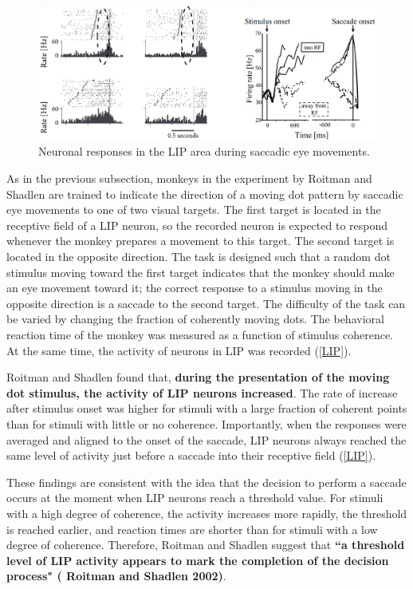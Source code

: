 \documentclass[12pt,hyperref,a4paper,UTF8]{ctexart}
\begin{document}
\begin{figure}[h]
    \begin{center}
    \includegraphics[width=1\textwidth]{LIP.png}
    \caption{Neuronal responses in the LIP area during saccadic eye movements.}
    \label{LIP}
    \end{center}
\end{figure}

As in the previous subsection, monkeys in the experiment by Roitman and Shadlen are trained to indicate the direction of a moving dot pattern by saccadic eye movements to one of two visual targets. The first target is located in the receptive field of a LIP neuron, so the recorded neuron is expected to respond whenever the monkey prepares a movement to this target. The second target is located in the opposite direction. The task is designed such that a random dot stimulus moving toward the first target indicates that the monkey should make an eye movement toward it; the correct response to a stimulus moving in the opposite direction is a saccade to the second target. The difficulty of the task can be varied by changing the fraction of coherently moving dots. The behavioral reaction time of the monkey was measured as a function of stimulus coherence. At the same time, the activity of neurons in LIP was recorded (\autoref{LIP}).

Roitman and Shadlen found that, \textbf{during the presentation of the moving dot stimulus, the activity of LIP neurons increased}. The rate of increase after stimulus onset was higher for stimuli with a large fraction of coherent points than for stimuli with little or no coherence. Importantly, when the responses were averaged and aligned to the onset of the saccade, LIP neurons always reached the same level of activity just before a saccade into their receptive field (\autoref{LIP}).

These findings are consistent with the idea that the decision to perform a saccade occurs at the moment when LIP neurons reach a threshold value. For stimuli with a high degree of coherence, the activity increases more rapidly, the threshold is reached earlier, and reaction times are shorter than for stimuli with a low degree of coherence. Therefore, Roitman and Shadlen suggest that \textbf{``a threshold level of LIP activity appears to mark the completion of the decision process" (\cite{Roitman and Shadlen 2002} Roitman and Shadlen 2002)}.
\end{document}
